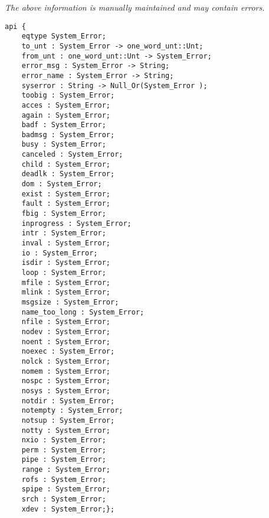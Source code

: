 \label{api:Posix\_Error}

{\tiny \it The above information is manually maintained and may contain errors.}
\begin{verbatim}
api {
    eqtype System_Error;
    to_unt : System_Error -> one_word_unt::Unt;
    from_unt : one_word_unt::Unt -> System_Error;
    error_msg : System_Error -> String;
    error_name : System_Error -> String;
    syserror : String -> Null_Or(System_Error );
    toobig : System_Error;
    acces : System_Error;
    again : System_Error;
    badf : System_Error;
    badmsg : System_Error;
    busy : System_Error;
    canceled : System_Error;
    child : System_Error;
    deadlk : System_Error;
    dom : System_Error;
    exist : System_Error;
    fault : System_Error;
    fbig : System_Error;
    inprogress : System_Error;
    intr : System_Error;
    inval : System_Error;
    io : System_Error;
    isdir : System_Error;
    loop : System_Error;
    mfile : System_Error;
    mlink : System_Error;
    msgsize : System_Error;
    name_too_long : System_Error;
    nfile : System_Error;
    nodev : System_Error;
    noent : System_Error;
    noexec : System_Error;
    nolck : System_Error;
    nomem : System_Error;
    nospc : System_Error;
    nosys : System_Error;
    notdir : System_Error;
    notempty : System_Error;
    notsup : System_Error;
    notty : System_Error;
    nxio : System_Error;
    perm : System_Error;
    pipe : System_Error;
    range : System_Error;
    rofs : System_Error;
    spipe : System_Error;
    srch : System_Error;
    xdev : System_Error;};
\end{verbatim}
